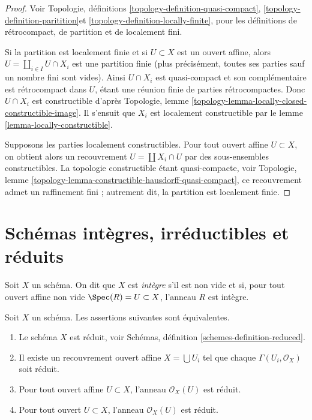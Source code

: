 \begin{proof}
Voir Topologie, définitions
\ref{topology-definition-quasi-compact},
\ref{topology-definition-paritition}et
\ref{topology-definition-locally-finite},
pour les définitions de rétrocompact, de partition et de localement fini.

\medskip\noindent
Si la partition est localement finie et si $U \subset X$ est
un ouvert affine, alors $U = \coprod_{i \in I} U \cap X_i$
est une partition finie (plus précisément, toutes ses parties sauf
un nombre fini sont vides). Ainsi $U \cap X_i$ est quasi-compact
et son complémentaire est rétrocompact dans $U$, étant une réunion
finie de parties rétrocompactes. Donc $U \cap X_i$ est constructible
d'après Topologie, lemme \ref{topology-lemma-locally-closed-constructible-image}.
Il s'ensuit que $X_i$ est localement constructible par le
lemme \ref{lemma-locally-constructible}.

\medskip\noindent
Supposons les parties localement constructibles. Pour tout ouvert
affine $U \subset X$, on obtient alors un recouvrement $U = \coprod X_i \cap U$
par des sous-ensembles constructibles. La topologie constructible étant
quasi-compacte, voir
Topologie, lemme \ref{topology-lemma-constructible-hausdorff-quasi-compact},
ce recouvrement admet un raffinement fini ; autrement
dit, la partition est localement finie.
\end{proof}




\section{Schémas intègres, irréductibles et réduits}
\label{section-integral}

\begin{definition}
\label{definition-integral}
Soit $X$ un schéma. On dit que $X$ est {\it intègre} s'il est non vide et
si, pour tout ouvert affine non vide $\Spec(R) = U \subset X$, l'anneau $R$
est intègre.
\end{definition}

\begin{lemma}
\label{lemma-characterize-reduced}
Soit $X$ un schéma. Les
assertions suivantes sont équivalentes.
\begin{enumerate}
\item Le schéma $X$ est réduit, voir
Schémas, définition \ref{schemes-definition-reduced}.
\item Il existe un recouvrement ouvert affine $X = \bigcup U_i$
tel que chaque $\Gamma(U_i, \mathcal{O}_X)$ soit réduit.
\item Pour tout ouvert affine $U \subset X$, l'anneau
$\mathcal{O}_X(U)$ est réduit.
\item Pour tout ouvert $U \subset X$, l'anneau $\mathcal{O}_X(U)$ est réduit.
\end{enumerate}
\end{lemma}


